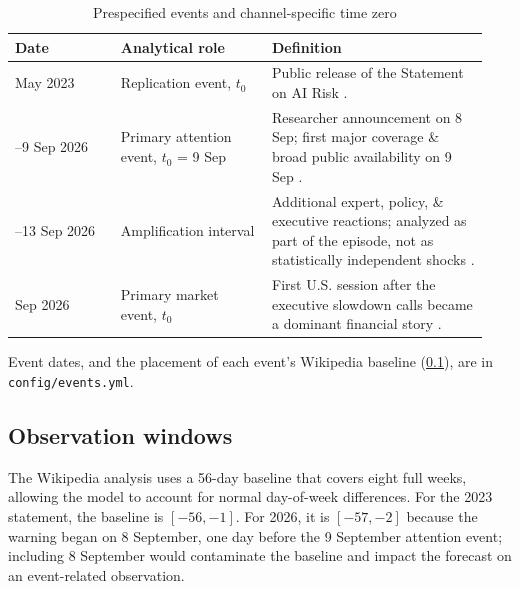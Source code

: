 \elsevierclasstrue\documentclass[preprint,12pt]{elsarticle}%
\begin{document}
\begin{table}[ht!]
\centering
\footnotesize
\caption{Prespecified events and channel-specific time zero}
\label{tab:events}
\begin{threeparttable}
\begin{tabular}{@{}>{\raggedright\arraybackslash}p{0.21\linewidth}>{\raggedright\arraybackslash}p{0.3\linewidth}>{\raggedright\arraybackslash}p{0.43\linewidth}@{}}
\toprule
Date & Analytical role & Definition \\
\midrule
30 May 2023 & Replication event, $t_0$ & Public release of the Statement on AI Risk \citep{cais2023statement}. \\
8--9 Sep 2026 & Primary attention event, $t_0$ = 9 Sep & Researcher announcement on 8 Sep; first major coverage \& broad public availability on 9 Sep \citep{bellan2026gambling}. \\
10--13 Sep 2026 & Amplification interval & Additional expert, policy, \& executive reactions; analyzed as part of the episode, not as statistically independent shocks \citep{rozen2026lawmakers}. \\
14 Sep 2026 & Primary market event, $t_0$ & First U.S. session after the executive slowdown calls became a dominant financial story \citep{reuters2026markets}.\\
\bottomrule
\end{tabular}
\begin{tablenotes}[flushleft]\footnotesize
\item Event dates, and the placement of each event's Wikipedia baseline (\cref{sec:windows}), are in \texttt{config/events.yml}.
\end{tablenotes}
\end{threeparttable}
\end{table}


\subsection{Observation windows}
\label{sec:windows}

The Wikipedia analysis uses a 56-day baseline that covers eight full weeks, allowing the model to account for normal day-of-week differences. For the 2023 statement, the baseline is $[-56,-1]$. For 2026, it is $[-57,-2]$ because the warning began on 8 September, one day before the 9 September attention event; including 8 September would contaminate the baseline and impact the forecast on an event-related observation.
\end{document}
